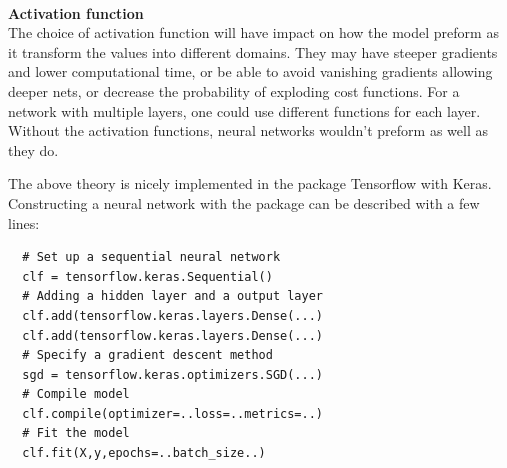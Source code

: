 \\
\par
\textbf{Activation function}\\
The choice of activation function will have impact on how the model preform as it transform the values into different domains. They may have steeper gradients and lower computational time, or be able to avoid vanishing gradients allowing deeper nets, or decrease the probability of exploding cost functions. For a network with multiple layers, one could use different functions for each layer. Without the activation functions, neural networks wouldn't preform as well as they do.
\\
\par
The above theory is nicely implemented in the package Tensorflow with Keras. Constructing a neural network with the package can be described with a few lines:

\begin{verbatim}
  # Set up a sequential neural network
  clf = tensorflow.keras.Sequential()
  # Adding a hidden layer and a output layer
  clf.add(tensorflow.keras.layers.Dense(...)
  clf.add(tensorflow.keras.layers.Dense(...)
  # Specify a gradient descent method
  sgd = tensorflow.keras.optimizers.SGD(...)
  # Compile model
  clf.compile(optimizer=..loss=..metrics=..)
  # Fit the model
  clf.fit(X,y,epochs=..batch_size..) 
\end{verbatim}

